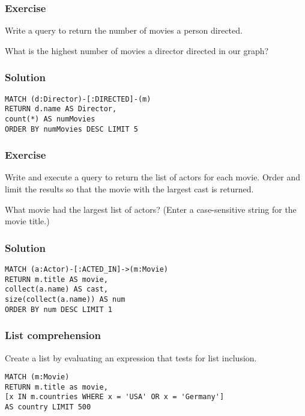 \begin{frame}[fragile]\frametitle{Exercise }

Write a query to return the number of movies a person directed.

What is the highest number of movies a director directed in our graph?


\end{frame}

\begin{frame}[fragile]\frametitle{Solution}

\begin{lstlisting}
MATCH (d:Director)-[:DIRECTED]-(m)
RETURN d.name AS Director,
count(*) AS numMovies
ORDER BY numMovies DESC LIMIT 5
\end{lstlisting}

\end{frame}

\begin{frame}[fragile]\frametitle{Exercise }

Write and execute a query to return the list of actors for each movie. Order and limit the results so that the movie with the largest cast is returned.

What movie had the largest list of actors? (Enter a case-sensitive string for the movie title.)

\end{frame}

\begin{frame}[fragile]\frametitle{Solution}

\begin{lstlisting}
MATCH (a:Actor)-[:ACTED_IN]->(m:Movie)
RETURN m.title AS movie,
collect(a.name) AS cast,
size(collect(a.name)) AS num
ORDER BY num DESC LIMIT 1
\end{lstlisting}

\end{frame}

\begin{frame}[fragile]\frametitle{List comprehension}

Create a list by evaluating an expression that tests for list inclusion.

\begin{lstlisting}
MATCH (m:Movie)
RETURN m.title as movie,
[x IN m.countries WHERE x = 'USA' OR x = 'Germany']
AS country LIMIT 500
\end{lstlisting}


\end{frame}

